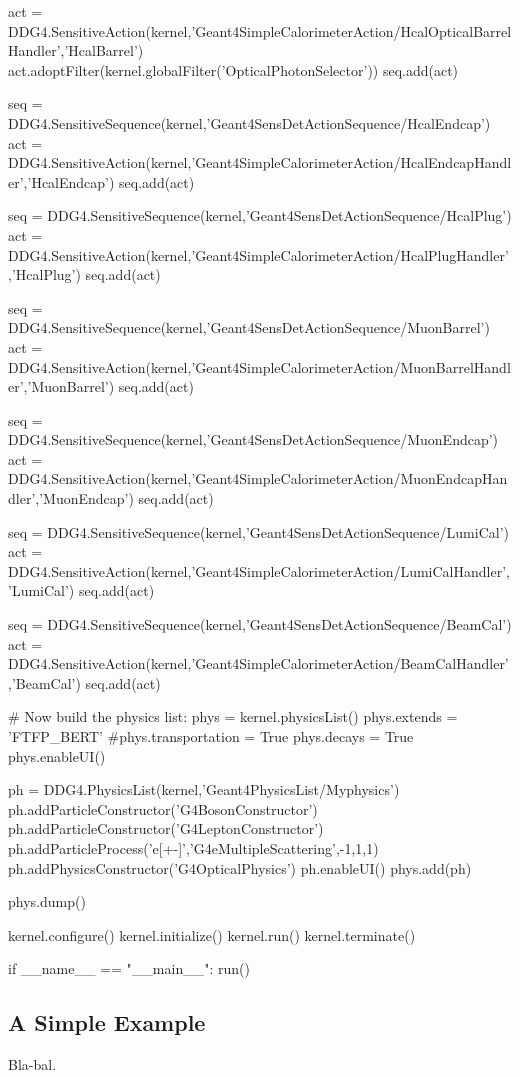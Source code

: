 \begin{code}
  act = DDG4.SensitiveAction(kernel,'Geant4SimpleCalorimeterAction/HcalOpticalBarrelHandler','HcalBarrel')
  act.adoptFilter(kernel.globalFilter('OpticalPhotonSelector'))
  seq.add(act)

  seq = DDG4.SensitiveSequence(kernel,'Geant4SensDetActionSequence/HcalEndcap')
  act = DDG4.SensitiveAction(kernel,'Geant4SimpleCalorimeterAction/HcalEndcapHandler','HcalEndcap')
  seq.add(act)

  seq = DDG4.SensitiveSequence(kernel,'Geant4SensDetActionSequence/HcalPlug')
  act = DDG4.SensitiveAction(kernel,'Geant4SimpleCalorimeterAction/HcalPlugHandler','HcalPlug')
  seq.add(act)

  seq = DDG4.SensitiveSequence(kernel,'Geant4SensDetActionSequence/MuonBarrel')
  act = DDG4.SensitiveAction(kernel,'Geant4SimpleCalorimeterAction/MuonBarrelHandler','MuonBarrel')
  seq.add(act)

  seq = DDG4.SensitiveSequence(kernel,'Geant4SensDetActionSequence/MuonEndcap')
  act = DDG4.SensitiveAction(kernel,'Geant4SimpleCalorimeterAction/MuonEndcapHandler','MuonEndcap')
  seq.add(act)

  seq = DDG4.SensitiveSequence(kernel,'Geant4SensDetActionSequence/LumiCal')
  act = DDG4.SensitiveAction(kernel,'Geant4SimpleCalorimeterAction/LumiCalHandler','LumiCal')
  seq.add(act)

  seq = DDG4.SensitiveSequence(kernel,'Geant4SensDetActionSequence/BeamCal')
  act = DDG4.SensitiveAction(kernel,'Geant4SimpleCalorimeterAction/BeamCalHandler','BeamCal')
  seq.add(act)

  # Now build the physics list:
  phys = kernel.physicsList()
  phys.extends = 'FTFP_BERT'
  #phys.transportation = True
  phys.decays  = True
  phys.enableUI()

  ph = DDG4.PhysicsList(kernel,'Geant4PhysicsList/Myphysics')
  ph.addParticleConstructor('G4BosonConstructor')
  ph.addParticleConstructor('G4LeptonConstructor')
  ph.addParticleProcess('e[+-]','G4eMultipleScattering',-1,1,1)
  ph.addPhysicsConstructor('G4OpticalPhysics')
  ph.enableUI()
  phys.add(ph)

  phys.dump()

  kernel.configure()
  kernel.initialize()
  kernel.run()
  kernel.terminate()

if __name__ == "__main__":
  run()

\end{code}

\newpage
\subsection{A Simple Example}
\label{sec:ddg4-implementation-simple-example}
\noindent
Bla-bal.

\newpage

